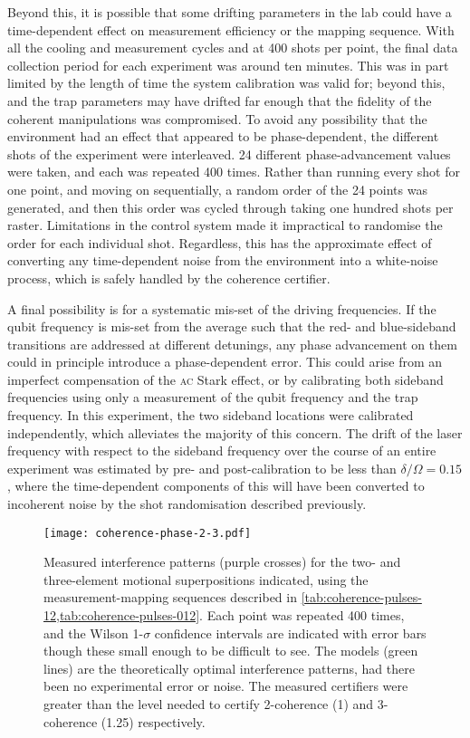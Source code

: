 Beyond this, it is possible that some drifting parameters in the lab could have a time-dependent effect on measurement efficiency or the mapping sequence.
With all the cooling and measurement cycles and at 400 shots per point, the final data collection period for each experiment was around ten minutes.
This was in part limited by the length of time the system calibration was valid for; beyond this, and the trap parameters may have drifted far enough that the fidelity of the coherent manipulations was compromised.
To avoid any possibility that the environment had an effect that appeared to be phase-dependent, the different shots of the experiment were interleaved.
24 different phase-advancement values were taken, and each was repeated 400 times.
Rather than running every shot for one point, and moving on sequentially, a random order of the 24 points was generated, and then this order was cycled through taking one hundred shots per raster.
Limitations in the control system made it impractical to randomise the order for each individual shot.
Regardless, this has the approximate effect of converting any time-dependent noise from the environment into a white-noise process, which is safely handled by the coherence certifier.

A final possibility is for a systematic mis-set of the driving frequencies.
If the qubit frequency is mis-set from the average such that the red- and blue-sideband transitions are addressed at different detunings, any phase advancement on them could in principle introduce a phase-dependent error.
This could arise from an imperfect compensation of the \textsc{ac} Stark effect, or by calibrating both sideband frequencies using only a measurement of the qubit frequency and the trap frequency.
In this experiment, the two sideband locations were calibrated independently, which alleviates the majority of this concern.
The drift of the laser frequency with respect to the sideband frequency over the course of an entire experiment was estimated by pre- and post-calibration to be less than $\delta/\Omega=0.15$, where the time-dependent components of this will have been converted to incoherent noise by the shot randomisation described previously.

\begin{figure*}%
    \texttt{[image: coherence-phase-2-3.pdf]}%
    \caption[Interference patterns for two- and three-element superpositions]{\label{fig:coherence-phase-2-3}%
    Measured interference patterns (purple crosses) for the two- and three-element motional superpositions indicated, using the measurement-mapping sequences described in \cref{tab:coherence-pulses-12,tab:coherence-pulses-012}.
    Each point was repeated 400 times, and the Wilson 1-$\sigma$ confidence intervals are indicated with error bars though these small enough to be difficult to see.
    The models (green lines) are the theoretically optimal interference patterns, had there been no experimental error or noise.
    The measured certifiers were greater than the level needed to certify 2-coherence (1) and 3-coherence (1.25) respectively.
    }%
\end{figure*}

